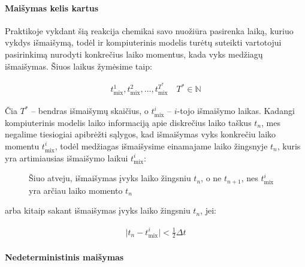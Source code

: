 \paragraph{Maišymas kelis kartus}

Praktikoje vykdant šią reakcija chemikai savo nuožiūra pasirenka laiką, kuriuo vykdys išmaišymą, todėl ir kompiuterinis modelis turėtų suteikti vartotojui pasirinkimą nurodyti konkrečius laiko momentus, kada vyks medžiagų išmaišymas. Šiuos laikus žymėsime taip:

\begin{align}
    t^1_\text{mix}, t^2_\text{mix}, \dots, t^{T^*}_\text{mix} \quad T^*\in \mathbb{N}
\end{align}

Čia $T^*$ -- bendras išmaišymų skaičius, o $t^i_\text{mix}$ -- $i$-tojo išmaišymo laikas. Kadangi kompiuterinis modelis laiko informaciją apie diskrečius laiko taškus $t_n$, mes negalime tiesiogiai apibrėžti sąlygos, kad išmaišymas vyks konkrečiu laiko momentu $t^i_\text{mix}$, todėl medžiagas išmaišysime einamajame laiko žingsnyje $t_n$, kuris yra artimiausias išmaišymo laikui $t^i_\text{mix}$:

\begin{figure}[!h]
\centering
\label{mix-inequality-graphic}
\caption{Šiuo atveju, išmaišymas įvyks laiko žingsniu $t_n$, o ne $t_{n+1}$, nes $t^i_\text{mix}$ yra arčiau laiko momento $t_n$}
\end{figure}

arba kitaip sakant išmaišymas įvyks laiko žingsniu $t_n$, jei:

\begin{align}
    \vert t_n - t^i_\text{mix} \vert < \frac{1}{2}\Delta t \label{mix-inequality}
\end{align}

\paragraph{Nedeterministinis maišymas}

